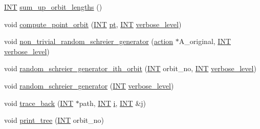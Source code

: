 \begin{DoxyCompactItemize}
\item 
\mbox{\hyperlink{galois_8h_a09fddde158a3a20bd2dcadb609de11dc}{I\+NT}} \mbox{\hyperlink{classschreier_a120472d378feabec676062f84b23fc8e}{sum\+\_\+up\+\_\+orbit\+\_\+lengths}} ()
\item 
void \mbox{\hyperlink{classschreier_a429138e463c8c25dddd8557340ed9edd}{compute\+\_\+point\+\_\+orbit}} (\mbox{\hyperlink{galois_8h_a09fddde158a3a20bd2dcadb609de11dc}{I\+NT}} \mbox{\hyperlink{clique__finder_8_c_aec1f1a2b30fdca8844c2932384483145}{pt}}, \mbox{\hyperlink{galois_8h_a09fddde158a3a20bd2dcadb609de11dc}{I\+NT}} \mbox{\hyperlink{simeon_8_c_a818073fbcc2f439e7c56952f67386122}{verbose\+\_\+level}})
\item 
void \mbox{\hyperlink{classschreier_a9077ff6a0c61629d6e73aeb56b39a6a0}{non\+\_\+trivial\+\_\+random\+\_\+schreier\+\_\+generator}} (\mbox{\hyperlink{classaction}{action}} $\ast$A\+\_\+original, \mbox{\hyperlink{galois_8h_a09fddde158a3a20bd2dcadb609de11dc}{I\+NT}} \mbox{\hyperlink{simeon_8_c_a818073fbcc2f439e7c56952f67386122}{verbose\+\_\+level}})
\item 
void \mbox{\hyperlink{classschreier_a285786eaa8f7e8d50d59c2335c549044}{random\+\_\+schreier\+\_\+generator\+\_\+ith\+\_\+orbit}} (\mbox{\hyperlink{galois_8h_a09fddde158a3a20bd2dcadb609de11dc}{I\+NT}} orbit\+\_\+no, \mbox{\hyperlink{galois_8h_a09fddde158a3a20bd2dcadb609de11dc}{I\+NT}} \mbox{\hyperlink{simeon_8_c_a818073fbcc2f439e7c56952f67386122}{verbose\+\_\+level}})
\item 
void \mbox{\hyperlink{classschreier_a0f5d195438630963accd737f56c1214f}{random\+\_\+schreier\+\_\+generator}} (\mbox{\hyperlink{galois_8h_a09fddde158a3a20bd2dcadb609de11dc}{I\+NT}} \mbox{\hyperlink{simeon_8_c_a818073fbcc2f439e7c56952f67386122}{verbose\+\_\+level}})
\item 
void \mbox{\hyperlink{classschreier_a584db152dcbed43b5d2e036bb8146b94}{trace\+\_\+back}} (\mbox{\hyperlink{galois_8h_a09fddde158a3a20bd2dcadb609de11dc}{I\+NT}} $\ast$path, \mbox{\hyperlink{galois_8h_a09fddde158a3a20bd2dcadb609de11dc}{I\+NT}} \mbox{\hyperlink{alphabet2_8_c_acb559820d9ca11295b4500f179ef6392}{i}}, \mbox{\hyperlink{galois_8h_a09fddde158a3a20bd2dcadb609de11dc}{I\+NT}} \&\mbox{\hyperlink{alphabet2_8_c_a37d972ae0b47b9099e30983131d31916}{j}})
\item 
void \mbox{\hyperlink{classschreier_a061ee745522fd39eef92cdd519869c99}{print\+\_\+tree}} (\mbox{\hyperlink{galois_8h_a09fddde158a3a20bd2dcadb609de11dc}{I\+NT}} orbit\+\_\+no)
\item 

\end{DoxyCompactItemize}
